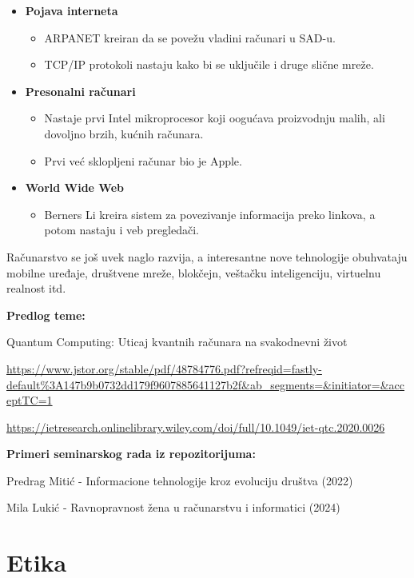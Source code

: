 \documentclass{article}
\begin{document}
\begin{itemize}
\begin{itemize}[label=-]
        \end{itemize}
    \item \textbf{Pojava interneta}
        \begin{itemize}[label=-]
            \item ARPANET kreiran da se povežu vladini računari u SAD-u.
            \item TCP/IP protokoli nastaju kako bi se uključile i druge slične mreže.
        \end{itemize}
    \item \textbf{Presonalni računari}
        \begin{itemize}[label=-]
            \item Nastaje prvi Intel mikroprocesor koji oogućava proizvodnju malih, ali dovoljno brzih, kućnih računara.
            \item Prvi već sklopljeni računar bio je Apple.
        \end{itemize}
    \item \textbf{World Wide Web}
        \begin{itemize}[label=-]
            \item Berners Li kreira sistem za povezivanje informacija preko linkova, a potom nastaju i veb pregledači.
        \end{itemize}
\end{itemize}

Računarstvo se još uvek naglo razvija, a interesantne nove tehnologije obuhvataju mobilne uređaje, društvene mreže, blokčejn, veštačku inteligenciju, virtuelnu realnost itd.

\textbf{Predlog teme:} 

Quantum Computing: Uticaj kvantnih računara na svakodnevni život

\url{https://www.jstor.org/stable/pdf/48784776.pdf?refreqid=fastly-default%3A147b9b0732dd179f9607885641127b2f&ab_segments=&initiator=&acceptTC=1}

\url{https://ietresearch.onlinelibrary.wiley.com/doi/full/10.1049/iet-qtc.2020.0026}

\textbf{Primeri seminarskog rada iz repozitorijuma:}

Predrag Mitić - Informacione tehnologije kroz evoluciju društva (2022)

Mila Lukić - Ravnopravnost žena u računarstvu i informatici (2024)

\section{Etika}
\end{document}
